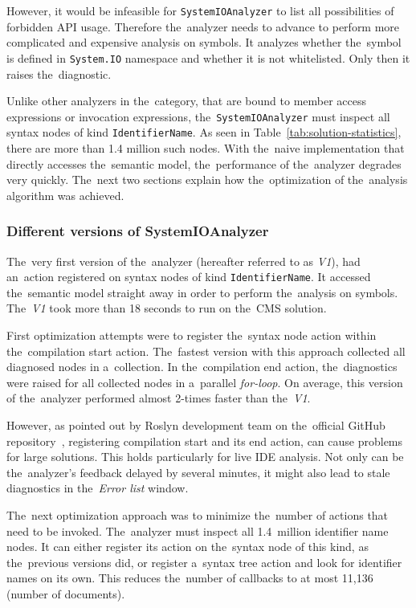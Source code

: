 \documentclass[
  digital, %
  table,   %
  lof,     %
  lot,     %
  oneside,
]{fithesis3}
\begin{document}
However, it would be infeasible for \texttt{SystemIOAnalyzer} to list all possibilities of forbidden API usage. Therefore the~analyzer needs to advance to perform more complicated and expensive analysis on symbols. It analyzes whether the~symbol is defined in \texttt{System.IO} namespace and whether it is not whitelisted. Only then it raises the~diagnostic.

Unlike other analyzers in the~category, that are bound to member access expressions or invocation expressions, the~\texttt{SystemIOAnalyzer} must inspect all syntax nodes of kind \texttt{IdentifierName}. As seen in Table~\ref{tab:solution-statistics}, there are more than 1.4 million such nodes. With the~naive implementation that directly accesses the~semantic model, the~performance of the~analyzer degrades very quickly. The~next two sections explain how the~optimization of the~analysis algorithm was achieved.

\subsubsection{\textbf{Different versions of SystemIOAnalyzer}}
The~very first version of the~analyzer (hereafter referred to as \textit{V1}), had an~action registered on syntax nodes of kind \texttt{IdentifierName}. It accessed the~semantic model straight away in order to perform the~analysis on symbols. The~\textit{V1} took more than 18 seconds to run on the~CMS solution.

First optimization attempts were to register the~syntax node action within the~compilation start action. The~fastest version with this approach collected all diagnosed nodes in a~collection. In the~compilation end action, the~diagnostics were raised for all collected nodes in a~parallel \textit{for-loop}. On average, this version of the~analyzer performed almost 2-times faster than the~\textit{V1}.

However, as pointed out by Roslyn development team on the~official GitHub repository~\cite{compilation-end-action-1, compilation-end-action-2}, registering compilation start and its end action, can cause problems for large solutions. This holds particularly for live IDE analysis. Not only can be the~analyzer's feedback delayed by several minutes, it might also lead to stale diagnostics in the~\textit{Error list} window.

The~next optimization approach was to minimize the~number of actions that need to be invoked. The~analyzer must inspect all 1.4~million identifier name nodes. It can either register its action on the~syntax node of this kind, as the~previous versions did, or register a~syntax tree action and look for identifier names on its own. This reduces the~number of callbacks to at most 11,136 (number of documents). 
\end{document}
